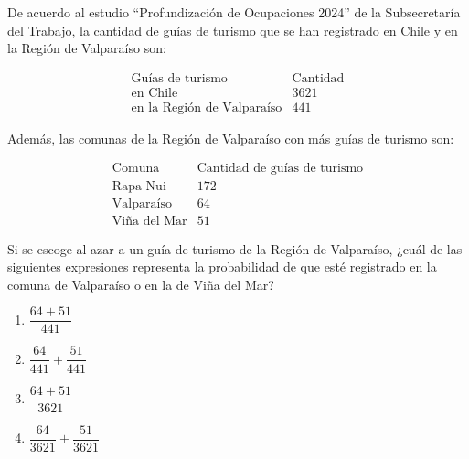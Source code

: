\begin{problem}
    De acuerdo al estudio “Profundización de Ocupaciones 2024” de la Subsecretaría del Trabajo, la cantidad de guías de turismo que se han registrado en Chile y en la Región de Valparaíso son:

    \[
    \begin{array}{c|c}
    \text{Guías de turismo} & \text{Cantidad} \\
    \hline
    \text{en Chile} & 3621 \\
    \text{en la Región de Valparaíso} & 441
    \end{array}
    \]

    Además, las comunas de la Región de Valparaíso con más guías de turismo son:

    \[
    \begin{array}{c|c}
    \text{Comuna} & \text{Cantidad de guías de turismo} \\
    \hline
    \text{Rapa Nui} & 172 \\
    \text{Valparaíso} & 64 \\
    \text{Viña del Mar} & 51
    \end{array}
    \]

    Si se escoge al azar a un guía de turismo de la Región de Valparaíso, ¿cuál de las siguientes expresiones representa la probabilidad de que esté registrado en la comuna de Valparaíso o en la de Viña del Mar?

    \begin{enumerate}[label=\Alph*.]
        \item $\dfrac{64 + 51}{441}$
        \item $\dfrac{64}{441} + \dfrac{51}{441}$
        \item $\dfrac{64 + 51}{3621}$
        \item $\dfrac{64}{3621} + \dfrac{51}{3621}$
    \end{enumerate}
\end{problem}
